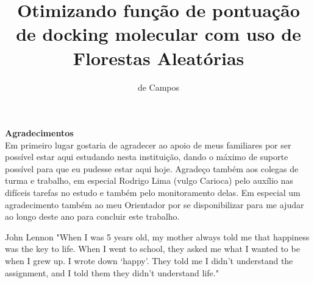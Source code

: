 \documentclass[tcc, capa]{texucpel}
\title{Otimizando função de pontuação de docking molecular com uso de Florestas Aleatórias}
\author{de Campos}{Gianluca}
\begin{document}
\maketitle 
\renewcommand{\advisorname}
{Orientador}          
\sloppy
\fichacatalografica
\folhadeaprovacao

\begin{agradecimentos}
\textbf{Agradecimentos} \\
Em primeiro lugar gostaria de agradecer ao apoio de meus familiares por ser possível estar aqui estudando nesta instituição, dando o máximo de suporte possível para que eu pudesse estar aqui hoje. Agradeço também aos colegas de turma e trabalho, em especial Rodrigo Lima (vulgo Carioca) pelo auxílio nas difíceis tarefas no estudo e também pelo monitoramento delas. Em especial um agradecimento também ao meu Orientador por se disponibilizar para me ajudar ao longo deste ano para concluir este trabalho.
\vspace{\baselineskip}
\end{agradecimentos}


\begin{epigrafe}{John Lennon}
"When I was 5 years old, my mother always told me that happiness was the key to life. When I went to school, they asked me what I wanted to be when I grew up. I wrote down ‘happy’. They told me I didn’t understand the assignment, and I told them they didn’t understand life."\\
\end{epigrafe}

\end{document}
